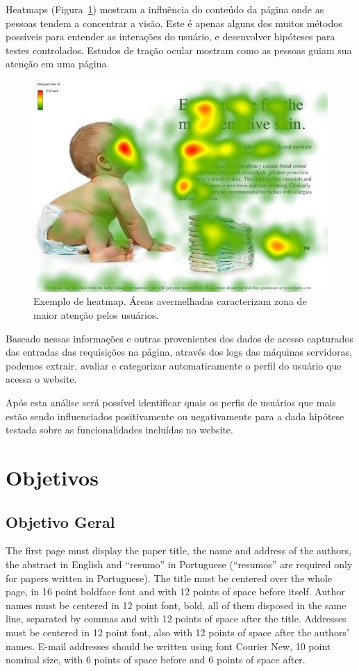 \documentclass[12pt]{article}
\begin{document}
Heatmaps (Figura~\ref{fig:heatmap1}) mostram a influência do conteúdo da página onde as pessoas tendem a concentrar a visão. Este é apenas alguns dos muitos métodos possíveis para entender as interações do usuário, e desenvolver hipóteses para testes controlados. Estudos de tração ocular mostram como as pessoas guiam sua atenção em uma página.
\cite{goward:13}

\begin{figure}[ht]
\centering
\includegraphics[width=.8\textwidth]{fig1.jpg}
\caption{Exemplo de heatmap. Áreas avermelhadas caracterizam zona de maior atenção pelos usuários. }
\label{fig:heatmap1}
\end{figure}

Baseado nessas informações e outras provenientes dos dados de acesso capturados das entradas das requisições na página, através dos logs das máquinas servidoras, podemos extrair, avaliar e categorizar automaticamente o perfil do usuário que acessa o website.

Após esta análise será possível identificar quais os perfis de usuários que mais estão sendo influenciados positivamente ou negativamente para a dada hipótese testada sobre as funcionalidades incluídas no website.

\section{Objetivos}
\subsection{Objetivo Geral}
The first page must display the paper title, the name and address of the
authors, the abstract in English and ``resumo'' in Portuguese (``resumos'' are
required only for papers written in Portuguese). The title must be centered
over the whole page, in 16 point boldface font and with 12 points of space
before itself. Author names must be centered in 12 point font, bold, all of
them disposed in the same line, separated by commas and with 12 points of
space after the title. Addresses must be centered in 12 point font, also with
12 points of space after the authors' names. E-mail addresses should be
written using font Courier New, 10 point nominal size, with 6 points of space
before and 6 points of space after.
\end{document}
